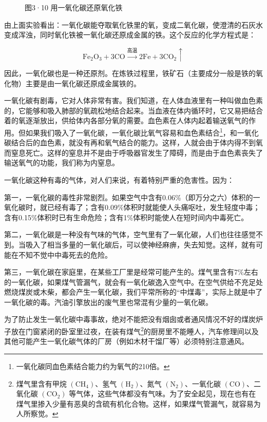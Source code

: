 \begin{figure}
\centering
\caption{图3·10 用一氧化碳还原氧化铁}
\end{figure}

由上面实验看出：一氧化碳能夺取氧化铁里的氧，变成二氧化碳，使澄清的石灰水变成浑浊，同时氧化铁被一氧化碳还原成金属的铁。这个反应的化学方程式是：

\[
\mathrm{Fe}_{2} \mathrm{O}_{3} + 3 \mathrm{CO} \xrightarrow {\text{高温}} 2 \mathrm{Fe} + 3 \mathrm{CO}_{2} \uparrow
\]

因此，一氧化碳也是一种还原剂。在炼铁过程里，铁矿石（主要成分一般是铁的氧化物）主要是由一氧化碳还原成金属铁的。

一氧化碳有剧毒，它对人体非常有害。我们知道，在人体血液里有一种叫做血色素的，它能够和吸入肺部的氧疏松地结合起来。当血液在体内循环时，它又易把结合着的氧逐渐放出，供给体内各部分氧的需要。血色素在人体内起着输送氧气的作用。但如果我们吸入了一氧化碳，一氧化碳比氧气容易和血色素结合\footnote{一氧化碳同血色素结合能力约为氧气的210倍。}，和一氧化碳结合后的血色素，就没有再和氧气结合的能力。这样，人就会由于体内得不到氧而窒息死亡。这样的窒息并不是由于呼吸器官发生了障碍，而是由于血色素丧失了输送氧气的功能，我们称为内窒息。

一氧化碳这种有毒的气体，对人们来说，有着特别严重的危害性。因为：

第一，一氧化碳的毒性非常剧烈。如果空气中含有0.06\%（即万分之六）体积的一氧化碳时，就已经有毒了；含有0.09\%体积时就能使人头痛呕吐，发生轻度中毒；含有0.15\%体积时已有生命危险；含有1\%体积时能使人在短时间内中毒死亡。

第二，一氧化碳是一种没有气味的气体，空气里有了一氧化碳，人们也往往感觉不到。当吸入了相当多量的一氧化碳后，可以使神经麻痹，失去知觉。这样，就有可能在不知不觉中中毒死去的危险。

第三，一氧化碳在家庭里，在某些工厂里是经常可能产生的。煤气里含有7\%左右的一氧化碳，如果煤气管漏气，就会有一氧化碳逸入空气中。在空气供给不充足处燃烧煤炭或木柴，都会产生一氧化碳，我们平常所称的``中煤毒''，实际上就是中了一氧化碳的毒。汽油引擎放出的废气里也常混有少量的一氧化碳。

为了防止发生一氧化碳中毒事故，绝对不能把没有烟囱或者通风情况不好的煤炭炉子放在门窗紧闭的卧室里过夜，在装有煤气\footnote{煤气里含有甲烷
  \(\left(\mathrm{CH}_{4}\right)\)、氢气
  \(\left(\mathrm{H}_{2}\right)\)、氮气
  \(\left(\mathrm{N}_{2}\right)\)、一氧化碳
  \(\left(\mathrm{CO}\right)\)、二氧化碳
  \(\left(\mathrm{CO}_{2}\right)\)
  等气体，这些气体都没有气味。为了安全起见，现在也有在煤气里掺入少量有恶臭的含硫有机化合物。这样，如果煤气管漏气，就容易为人所察觉。}的厨房里不能睡人，汽车修理间以及其他可能产生一氧化碳气体的厂房（例如木材干馏厂等）必须特别注意通风。

